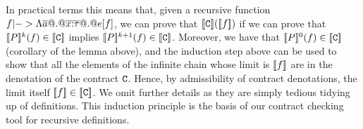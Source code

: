 In practical terms this means that, given a recursive function $f |-> \Lambda \overline{a} @.@ \overline{x{:}\tau} @.@ e[f]$, 
we can prove that $[\![{\tt C}]\!]([\![f]\!])$ if we can prove that 
$ [\![P]\!]^{k}(f) \in [\![{\tt C}]\!]$ implies $[\![P]\!]^{k+1}(f) \in [\![{\tt C}]\!]$. Moreover, we have that 
$ [\![P]\!]^{0}(f) \in [\![{\tt C}]\!]$ (corollary of the lemma above), and the induction step above can be 
used to show that all the elements of the infinite chain whose limit is $[\![f]\!]$ are in the denotation of 
the contract ${\tt C}$. Hence, by admissibility of contract denotations, the limit itself $[\![f]\!] \in [\![{\tt C}]\!]$. 
We omit further details as they are simply tedious tidying up of definitions. This induction principle is the basis
of our contract checking tool for recursive definitions.
